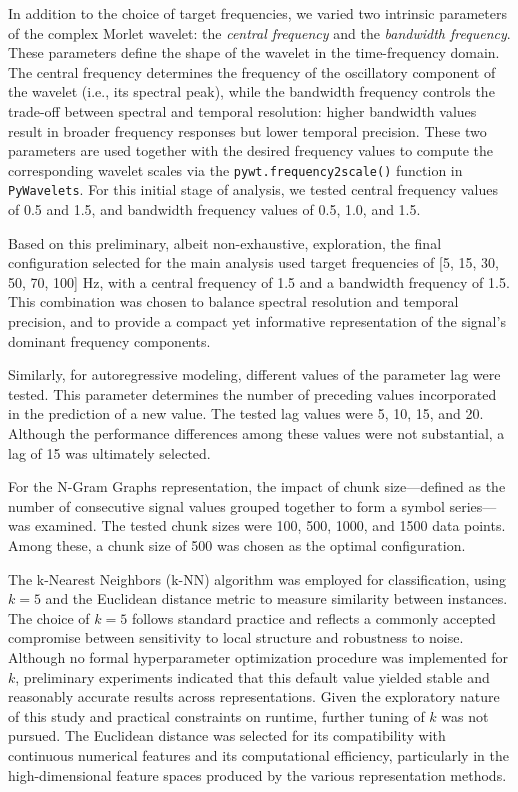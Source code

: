 \documentclass{article}
\begin{document}
In addition to the choice of target frequencies, we varied two intrinsic parameters of the complex Morlet wavelet: the \textit{central frequency} and the \textit{bandwidth frequency}. These parameters define the shape of the wavelet in the time-frequency domain. The central frequency determines the frequency of the oscillatory component of the wavelet (i.e., its spectral peak), while the bandwidth frequency controls the trade-off between spectral and temporal resolution: higher bandwidth values result in broader frequency responses but lower temporal precision. These two parameters are used together with the desired frequency values to compute the corresponding wavelet scales via the \texttt{pywt.frequency2scale()} function in \texttt{PyWavelets}. For this initial stage of analysis, we tested central frequency values of 0.5 and 1.5, and bandwidth frequency values of 0.5, 1.0, and 1.5.

Based on this preliminary, albeit non-exhaustive, exploration, the final configuration selected for the main analysis used target frequencies of [5, 15, 30, 50, 70, 100] Hz, with a central frequency of 1.5 and a bandwidth frequency of 1.5. This combination was chosen to balance spectral resolution and temporal precision, and to provide a compact yet informative representation of the signal’s dominant frequency components.

Similarly, for autoregressive modeling, different values of the parameter lag were tested. This parameter determines the number of preceding values incorporated in the prediction of a new value. The tested lag values were 5, 10, 15, and 20. Although the performance differences among these values were not substantial, a lag of 15 was ultimately selected.

For the N-Gram Graphs representation, the impact of chunk size—defined as the number of consecutive signal values grouped together to form a symbol series—was examined. The tested chunk sizes were 100, 500, 1000, and 1500 data points. Among these, a chunk size of 500 was chosen as the optimal configuration.

The k-Nearest Neighbors (k-NN) algorithm was employed for classification, using $k = 5$ and the Euclidean distance metric to measure similarity between instances. The choice of $k = 5$ follows standard practice and reflects a commonly accepted compromise between sensitivity to local structure and robustness to noise. Although no formal hyperparameter optimization procedure was implemented for $k$, preliminary experiments indicated that this default value yielded stable and reasonably accurate results across representations. Given the exploratory nature of this study and practical constraints on runtime, further tuning of $k$ was not pursued. The Euclidean distance was selected for its compatibility with continuous numerical features and its computational efficiency, particularly in the high-dimensional feature spaces produced by the various representation methods.
\end{document}
